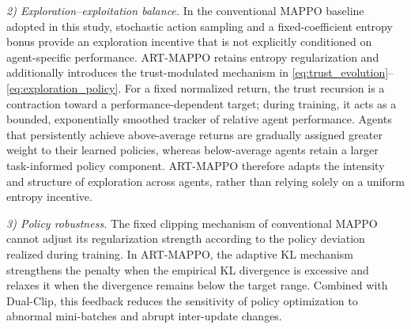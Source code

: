 \documentclass[lettersize,journal]{IEEEtran}
\newcommand{\hladd}[1]{{\color{blue}#1}}
\begin{document}

\hladd{\emph{2) Exploration--exploitation balance.}
In the conventional MAPPO baseline adopted in this study, stochastic action
sampling and a fixed-coefficient entropy bonus provide an exploration incentive
that is not explicitly conditioned on agent-specific performance. ART-MAPPO
retains entropy regularization and additionally introduces the trust-modulated
mechanism in \eqref{eq:trust_evolution}--\eqref{eq:exploration_policy}. For a
fixed normalized return, the trust recursion is a contraction toward a
performance-dependent target; during training, it acts as a bounded,
exponentially smoothed tracker of relative agent performance. Agents that
persistently achieve above-average returns are gradually assigned greater
weight to their learned policies, whereas below-average agents retain a larger
task-informed policy component. ART-MAPPO therefore adapts the intensity and
structure of exploration across agents, rather than relying solely on a uniform
entropy incentive. }

\hladd{\emph{3) Policy robustness.}
The fixed clipping mechanism of conventional MAPPO cannot adjust its
regularization strength according to the policy deviation realized during
training. In ART-MAPPO, the adaptive KL mechanism strengthens the penalty when
the empirical KL divergence is excessive and relaxes it when the divergence
remains below the target range. Combined with Dual-Clip, this feedback reduces
the sensitivity of policy optimization to abnormal mini-batches and abrupt
inter-update changes. }

\end{document}
